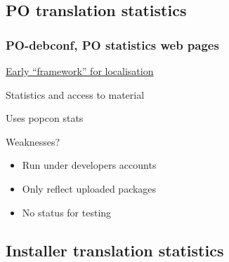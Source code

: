 \documentclass{beamer}
\begin{document}
\subsection{PO translation statistics}

\begin{frame}
  \frametitle{PO-debconf, PO statistics web pages}
	\begin{block}
		{\href{http://www.debian.org/intl/l10n/po-debconf/fr}{Early ``framework'' for localisation}}
	\end{block}
	\begin{block}
		{Statistics and access to material}
	\end{block}
	\begin{block}
		{Uses popcon stats}
	\end{block}
	\begin{block}
		{Weaknesses?}
		\begin{itemize}
		\item
			Run under developers accounts
		\item
			Only reflect uploaded packages
		\item
			No status for testing
		\end{itemize}
	\end{block}
\end{frame}
	
\subsection{Installer translation statistics}
\end{document}
